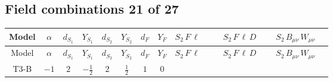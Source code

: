 \documentclass[8pt]{article}
\begin{document}
\begin{landscape}
\subsection*{Field combinations 21 of 27}
\begin{longtable}{@{}cccccccc >{\raggedright\arraybackslash}p{0.21\linewidth} >{\raggedright\arraybackslash}p{0.21\linewidth} >{\raggedright\arraybackslash}p{0.21\linewidth}@{}}
\toprule
Model & $\alpha$ & $d_{S_1}$ & $Y_{S_1}$ & $d_{S_2}$ & $Y_{S_2}$ & $d_F$ & $Y_F$ & $S_2\,F\,\ell$ & $S_2\,F\,\ell\,D$ & $S_2\,B_{\mu\nu}\,W_{\mu\nu}$ \\
\midrule
\endfirsthead
\toprule
Model & $\alpha$ & $d_{S_1}$ & $Y_{S_1}$ & $d_{S_2}$ & $Y_{S_2}$ & $d_F$ & $Y_F$ & $S_2\,F\,\ell$ & $S_2\,F\,\ell\,D$ & $S_2\,B_{\mu\nu}\,W_{\mu\nu}$ \\
\midrule
\endhead
T3-B & $-1$ & $2$ & $-\frac{1}{2}$ & $2$ & $\frac{1}{2}$ & $1$ & $0$ & \scriptsize\adjustbox{max width=\linewidth}{$\begin{gathered} -\frac{\hbar  \overline{y_{2,i_1,r_2}} F_{r_2}{}^T\, C\, P_L\, L_{a_1,i_1} S_{2,j_1} S_{2,j_2} {\mathcal{C}_{LS_2F}}^{*}_{a_1,j_2} S_{2,j_1}{}^{\dagger } g_2^4}{480 m_1^2} \\ -\frac{\hbar  \overline{L_{a_1,i_2}}\, P_R\, F_{r_1} S_{2,j_2} y_{2,i_2,r_1} \mathcal{I}_{y_2,a_1,j_1} S_{2,j_1}{}^{\dagger } S_{2,j_2}{}^{\dagger } g_2^4}{480 m_1^2} \\ -\frac{\hbar  \overline{y_{2,i_1,r_2}} F_{r_2}{}^T\, C\, P_L\, L_{a_1,i_1} S_{2,j_1} S_{2,j_2} {\mathcal{C}_{LS_2F}}^{*}_{a_1,j_2} S_{2,j_1}{}^{\dagger } \left(\lambda_{12}^{(1)}^{(1)}\right){}^2}{12 m_1^2}\end{gathered}$} & \scriptsize\adjustbox{max width=\linewidth}{$\begin{gathered} +\frac{\hbar  \overline{y_{1,i_2,r_2}} \overline{y_{2,i_1,r_1}} D_{\mu _1}\left(F_{r_2}\right){}^T\, C\, \gamma ^{\mu _1}\, \gamma ^{\mu _2}\, P_L\, D_{\mu _2}\left(L_{a_1,i_1}\right) S_{2,j_1} y_{1,i_2,r_1} {\mathcal{C}_{LS_2F}}^{*}_{a_1,j_1}}{6 m_1^2} \\ -\frac{i \hbar  \overline{y_{1,i_2,r_2}} \overline{y_{2,i_1,r_1}} F_{r_2}{}^T\, C\, \gamma ^{\mu _1}\, P_L\, D_{\mu _1}\left(L_{a_1,i_1}\right) M_F S_{2,j_1} y_{1,i_2,r_1} {\mathcal{C}_{LS_2F}}^{*}_{a_1,j_1}}{6 m_1^2} \\ -\frac{\hbar  \overline{y_{1,i_1,r_2}} \overline{D_{\mu _1}\left(L_{a_1,i_2}\right)}\, \gamma ^{\mu _1}\, \gamma ^{\mu _2}\, P_R\, D_{\mu _2}\left(F_{r_1}\right) y_{1,i_1,r_1} y_{2,i_2,r_2} \mathcal{I}_{y_2,a_1,j_1} S_{2,j_1}{}^{\dagger }}{6 m_1^2}\end{gathered}$} & \scriptsize\adjustbox{max width=\linewidth}{$\begin{gathered} +\frac{\hbar  B_{\mu _1\mu _2} S_{2,j_2} \text{gen}(\text{T3BSMd2})_{A_1,j_1,j_2} W_{\mu _1\mu _2}^{A_1} S_{2,j_1}{}^{\dagger } \lambda_{12}^{(1)}^{(1)}}{12 m_1^2} \\ -\frac{\hbar  B_{\mu _1\mu _2} S_{2,j_2} \text{gen}(\text{T3BSMd2})_{A_1,j_1,j_2} W_{\mu _1\mu _2}^{A_1} S_{2,j_1}{}^{\dagger } \lambda_{12}^{(1)}^{(2)}}{12 \sqrt{3} m_1^2}\end{gathered}$} \\

\end{longtable}
\end{landscape}
\end{document}
